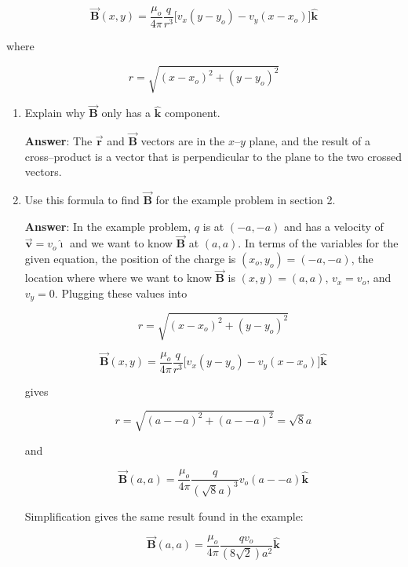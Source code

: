 \documentclass{article}
\newcommand{\ihat}[0]{\hat{\boldsymbol{\imath}}}
\newcommand{\khat}[0]{\hat{\boldsymbol{k}}}
\newcommand{\bfvec}[1]{\vec{\mathbf{#1}}}
\begin{document}
$$\bfvec{B}(x,y)= \frac{\mu_o}{4\pi} \frac{q}{r^3} \big[v_x(y-y_o) - v_y(x-x_o)\big]\khat$$

where

$$r=\sqrt{(x-x_o)^2+(y-y_o)^2}$$

\begin{enumerate}

  \item Explain why $\bfvec{B}$ only has a $\khat$ component.

        \ifsolutions
        \textbf{Answer}: The $\bfvec{r}$ and $\bfvec{B}$ vectors are in the $x$--$y$ plane, and the result of a cross--product is a vector that is perpendicular to the plane to the two crossed vectors.
        \else
        \vskip 36pt
        \fi

  \item Use this formula to find $\bfvec{B}$ for the example problem in section 2.

        \ifsolutions
        \textbf{Answer}: In the example problem, $q$ is at $(-a,-a)$ and has a velocity of $\bfvec{v}=v_o\ihat$ and we want to know $\bfvec{B}$ at $(a,a)$. In terms of the variables for the given equation, the position of the charge is $(x_o,y_o)=(-a,-a)$, the location where where we want to know $\bfvec{B}$ is $(x,y)=(a,a)$, $v_x=v_o$, and $v_y=0$. Plugging these values into

        \vskip 12pt

        $$r=\sqrt{(x-x_o)^2+(y-y_o)^2}$$

        \vskip 12pt

        $$
        \bfvec{B}(x,y)= \frac{\mu_o}{4\pi} \frac{q}{r^3} \big[v_x(y-y_o) - v_y(x-x_o)\big]\khat
        $$

        \vskip 12pt

        gives

        \vskip 12pt

        $$r=\sqrt{(a--a)^2+(a--a)^2}=\sqrt{8}a$$

        \vskip 12pt

        and

        \vskip 12pt

        $$
        \bfvec{B}(a,a)= \frac{\mu_o}{4\pi} \frac{q}{(\sqrt{8}a)^3} v_o(a--a)\khat
        $$

        \vskip 12pt

        Simplification gives the same result found in the example:

        \vskip 12pt

        $$
        \bfvec{B}(a,a) = \frac{\mu_o}{4\pi} \frac{qv_o}{(8\sqrt{2})a^2}\khat
        $$
        \else
        \vskip 96pt
        \fi


\end{enumerate}
\end{document}

